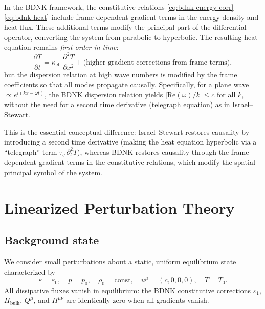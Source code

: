 In the BDNK framework, the constitutive relations
\eqref{eq:bdnk-energy-corr}--\eqref{eq:bdnk-heat} include
frame-dependent gradient terms in the energy density and heat flux.
These additional terms modify the principal part of the differential
operator, converting the system from parabolic to hyperbolic.  The
resulting heat equation remains \emph{first-order in time}:
\begin{equation}
  \frac{\partial T}{\partial t}
    = \kappa_{\mathrm{eff}}\,\frac{\partial^2 T}{\partial x^2}
    + \text{(higher-gradient corrections from frame terms)},
  \label{eq:bdnk-heat-firstorder}
\end{equation}
but the dispersion relation at high wave numbers is modified by the
frame coefficients so that all modes propagate causally.
Specifically, for a plane wave $\propto e^{i(kx - \omega t)}$, the
BDNK dispersion relation yields $|\mathrm{Re}(\omega)/k| \le c$
for all $k$, without the need for a second time derivative (telegraph
equation) as in Israel--Stewart.

This is the essential conceptual difference: Israel--Stewart restores
causality by introducing a second time derivative (making the heat
equation hyperbolic via a ``telegraph'' term $\tau_{q}\,\partial^{2}_{t}T$),
whereas BDNK restores causality through the frame-dependent gradient
terms in the constitutive relations, which modify the spatial
principal symbol of the system.


\section{Linearized Perturbation Theory}
\label{sec:linearized}

\subsection{Background state}
\label{sec:background}

We consider small perturbations about a static, uniform equilibrium
state characterized by
\begin{equation}
  \varepsilon = \varepsilon_0,
  \quad
  p = p_0,
  \quad
  \rho_0 = \text{const},
  \quad
  u^{\mu} = (c, 0, 0, 0),
  \quad
  T = T_0.
  \label{eq:background}
\end{equation}
All dissipative fluxes vanish in equilibrium: the BDNK constitutive
corrections $\varepsilon_1$, $\Pi_{\mathrm{bulk}}$, $Q^{\mu}$, and
$\Pi^{\mu\nu}$ are identically zero when all gradients vanish.

